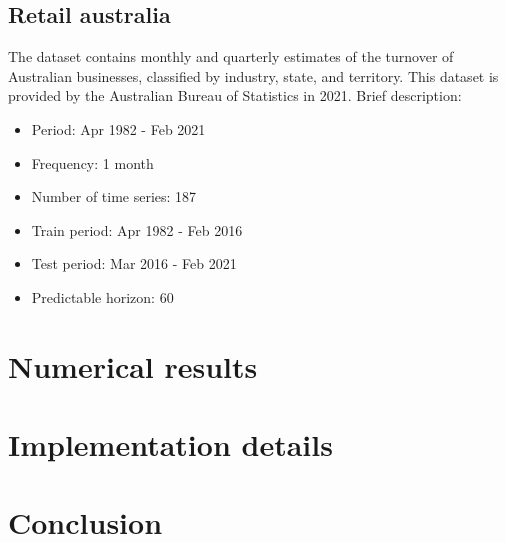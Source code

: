 \documentclass[12pt,a4paper]{article}
\begin{document}
\subsection{Retail australia}
The dataset contains monthly and quarterly estimates of the turnover of Australian businesses, classified by industry, state, and territory. This dataset is provided by the Australian Bureau of Statistics in 2021. Brief description:
\begin{itemize}
    \item Period: Apr 1982 - Feb 2021
    \item Frequency: 1 month
    \item Number of time series: 187
    \item Train period: Apr 1982 - Feb 2016
    \item Test period: Mar 2016 - Feb 2021
    \item Predictable horizon: 60
\end{itemize}

\section{Numerical results}



\section{Implementation details}

\section{Conclusion}


\end{document}
